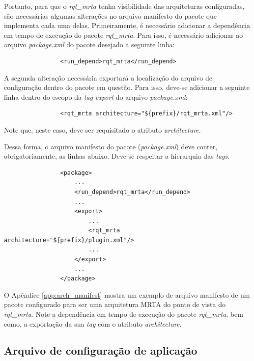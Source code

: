             Portanto, para que o \textit{rqt\_mrta} tenha visibilidade das arquiteturas configuradas, são necessárias algumas alterações no arquivo manifesto do pacote que implementa cada uma delas. Primeiramente, é necessário adicionar a dependência em tempo de execução do pacote \textit{rqt\_mrta}. Para isso, é necessário adicionar ao arquivo \textit{package.xml} do pacote desejado a seguinte linha:
            
            \begin{lstlisting}
                <run_depend>rqt_mrta</run_depend>
            \end{lstlisting}
            
            A segunda alteração necessária exportará a localização do arquivo de configuração dentro do pacote em questão. Para isso, deve-se adicionar a seguinte linha dentro do escopo da \textit{tag export} do arquivo \textit{package.xml}:
            
            \begin{lstlisting}
                <rqt_mrta architecture="${prefix}/rqt_mrta.xml"/>
            \end{lstlisting}
            
            Note que, neste caso, deve ser requisitado o atributo \textit{architecture}.
            
            Dessa forma, o arquivo manifesto do pacote (\textit{package.xml}) deve conter, obrigatoriamente, as linhas abaixo. Deve-se respeitar a hierarquia das \textit{tags}.
            
            \begin{lstlisting}
                <package>
                    ...
                    <run_depend>rqt_mrta</run_depend>
                    ...
                    <export>
                        ...
                        <rqt_mrta architecture="${prefix}/plugin.xml"/>
                        ...
                    </export>
                    ...
                </package>
            \end{lstlisting}
            
            O Apêndice \ref{app:arch_manifest} mostra um exemplo de arquivo manifesto de um pacote configurado para ser uma arquitetura MRTA do ponto de vista do \textit{rqt\_mrta}. Note a dependência em tempo de execução do pacote \textit{rqt\_mrta}, bem como, a exportação da sua \textit{tag} com o atributo \textit{architecture}.
        
        \subsection{Arquivo de configuração de aplicação} \label{subsec:app_config}
        
